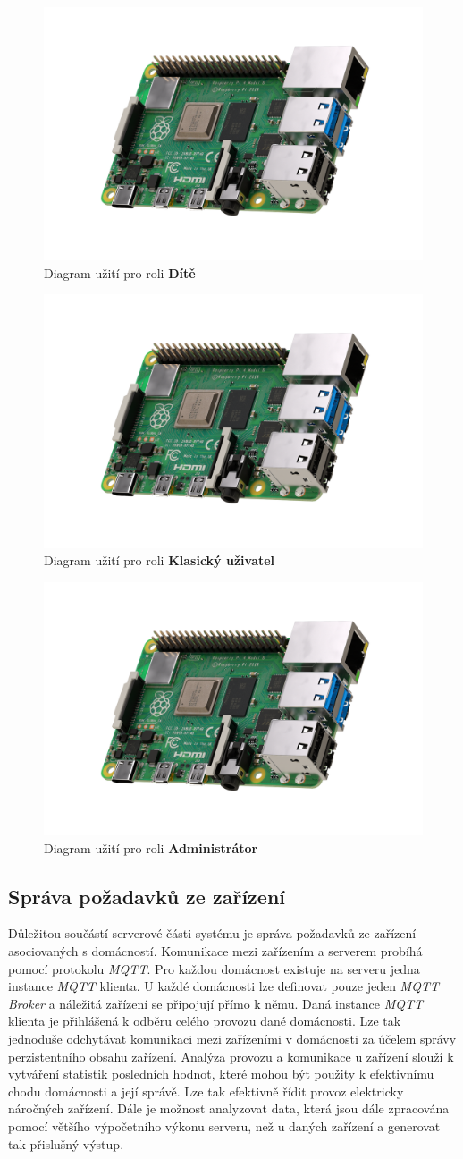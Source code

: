 \begin{figure}[hbt]
  \centering
  \includegraphics[width=0.4 \linewidth]{obrazky-figures/raspberry.png}
  \caption{Diagram užití pro roli \textbf{Dítě}}
  \label{figure:use_case_dite}
\end{figure}

\begin{figure}[hbt]
  \centering
  \includegraphics[width=0.4 \linewidth]{obrazky-figures/raspberry.png}
  \caption{Diagram užití pro roli \textbf{Klasický uživatel}}
  \label{figure:use_case_uzivatel}
\end{figure}

\begin{figure}[hbt]
  \centering
  \includegraphics[width=0.4 \linewidth]{obrazky-figures/raspberry.png}
  \caption{Diagram užití pro roli \textbf{Administrátor}}
  \label{figure:use_case_admin}
\end{figure}

\subsection*{Správa požadavků ze zařízení}
\label{backend:mqtt}

Důležitou součástí serverové části systému je správa požadavků ze zařízení asociovaných s domácností. Komunikace mezi zařízením a serverem probíhá pomocí protokolu \emph{MQTT}.
Pro každou domácnost existuje na serveru jedna instance \emph{MQTT} klienta. U každé domácnosti lze definovat pouze jeden \emph{MQTT Broker} a náležitá zařízení se připojují přímo k němu.
Daná instance \emph{MQTT} klienta je přihlášená k odběru celého provozu dané domácnosti. Lze tak jednoduše odchytávat komunikaci mezi zařízeními v domácnosti za účelem správy perzistentního obsahu zařízení.
Analýza provozu a komunikace u zařízení slouží k vytváření statistik posledních hodnot, které mohou být použity k efektivnímu chodu domácnosti a její správě.
Lze tak efektivně řídit provoz elektricky náročných zařízení. Dále je možnost analyzovat data, která jsou dále zpracována pomocí většího výpočetního výkonu serveru, než u daných zařízení a generovat tak přislušný výstup.

